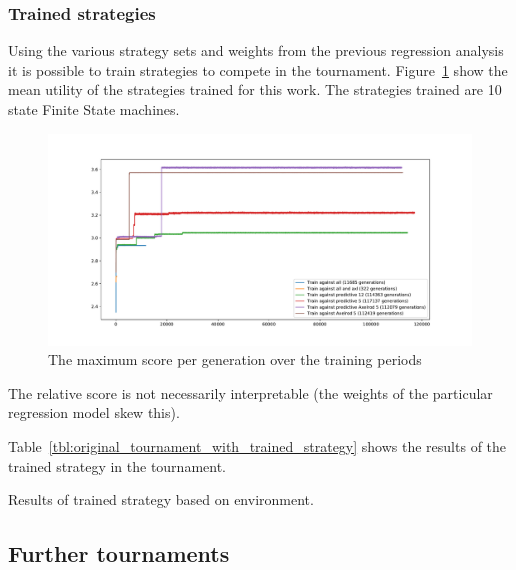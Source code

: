 \documentclass{article}
\begin{document}
\subsubsection{Trained strategies}

Using the various strategy sets and weights from the previous regression
analysis
it is possible to train strategies to compete in the tournament.
Figure~\ref{fig:training_data_max_score} show the mean utility of the strategies
trained for this work. The strategies trained are 10 state Finite State
machines.

\begin{figure}[!hbtp]
    \centering
    \includegraphics[width=.8\textwidth]{assets/training_data_max_score.pdf}
    \caption{The maximum score per generation over the training periods}
    \label{fig:training_data_max_score}
\end{figure}

The relative score is not necessarily interpretable (the weights of the
particular regression model skew this).

Table~\ref{tbl:original_tournament_with_trained_strategy} shows the results of
the trained strategy in the tournament.

\begin{table}[!hbtp]
        \centering
        \tiny
        
        \caption{Results of trained strategy based on environment.}
         \label{tbl:original_tournament_with_trained_strategy}
\end{table}


\subsection{Further tournaments}
\end{document}
